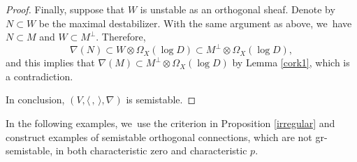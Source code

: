 \documentclass[JEP,XML,SOM,Unicode,published]{cedram}
\newcommand{\grsemistable}{gr\nobreakdash-semi\-stable\xspace}
\theoremstyle{plain}
\theoremstyle{definition}
\begin{document}
\begin{proof}
Finally, suppose that $W$ is unstable as an orthogonal sheaf. Denote by $N\subset W$ be the maximal destabilizer. With the same argument as above, we~have $N\subset M$ and $W\subset M^\perp$. Therefore,
\[
\nabla(N)\subset W\otimes \Omega_X(\log D)\subset M^\perp\otimes \Omega_X(\log D),
\]
and this implies that $\nabla(M) \subset M^\perp\otimes\Omega_X(\log D)$ by Lemma \ref{cork1}, which is a contradiction.

In conclusion, $(V, \langle \,, \, \rangle, \nabla)$ is semistable.
\end{proof}

In the following examples, we~use the criterion in Proposition \ref{irregular} and construct examples of semistable orthogonal connections, which are not \grsemistable, in both characteristic zero and characteristic $p$.
\end{document}
